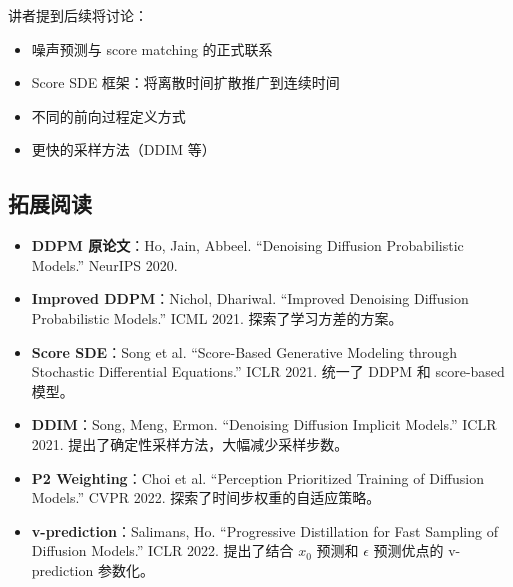 \documentclass[a4paper]{article}
\begin{document}
讲者提到后续将讨论：
\begin{itemize}
    \item 噪声预测与 score matching 的正式联系
    \item Score SDE 框架：将离散时间扩散推广到连续时间
    \item 不同的前向过程定义方式
    \item 更快的采样方法（DDIM 等）
\end{itemize}

\subsection{拓展阅读}

\begin{itemize}
    \item \textbf{DDPM 原论文}：Ho, Jain, Abbeel. ``Denoising Diffusion Probabilistic Models.'' NeurIPS 2020.
    \item \textbf{Improved DDPM}：Nichol, Dhariwal. ``Improved Denoising Diffusion Probabilistic Models.'' ICML 2021. 探索了学习方差的方案。
    \item \textbf{Score SDE}：Song et al. ``Score-Based Generative Modeling through Stochastic Differential Equations.'' ICLR 2021. 统一了 DDPM 和 score-based 模型。
    \item \textbf{DDIM}：Song, Meng, Ermon. ``Denoising Diffusion Implicit Models.'' ICLR 2021. 提出了确定性采样方法，大幅减少采样步数。
    \item \textbf{P2 Weighting}：Choi et al. ``Perception Prioritized Training of Diffusion Models.'' CVPR 2022. 探索了时间步权重的自适应策略。
    \item \textbf{v-prediction}：Salimans, Ho. ``Progressive Distillation for Fast Sampling of Diffusion Models.'' ICLR 2022. 提出了结合 $x_0$ 预测和 $\epsilon$ 预测优点的 v-prediction 参数化。
\end{itemize}
\end{document}
